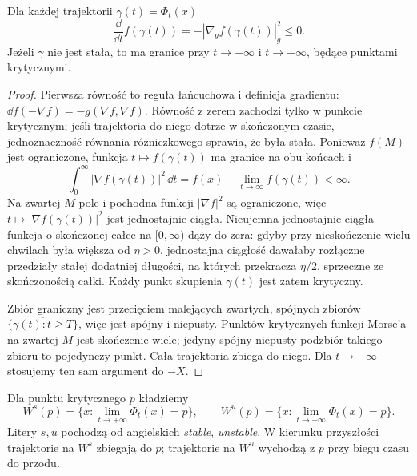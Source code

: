 \begin{stwierdzenie}
\label{prop:spadek-morse-17}
Dla każdej trajektorii $\gamma(t)=\Phi_t(x)$
\begin{equation}\label{eq:spadek-morse-17}
 \frac{\dd}{\dd t} f(\gamma(t))
 =-|\nabla_g f(\gamma(t))|_g^2\leq0.
\end{equation}
Jeżeli $\gamma$ nie jest stała, to
ma granice przy $t\to-\infty$
i $t\to+\infty$, będące
punktami krytycznymi.
\end{stwierdzenie}
\begin{proof}
Pierwsza równość to reguła łańcuchowa
i definicja gradientu:
$\dd f(-\nabla f)=-g(\nabla f,\nabla f)$.
Równość z zerem zachodzi tylko w punkcie
krytycznym; jeśli trajektoria
do niego dotrze w skończonym czasie,
jednoznaczność równania różniczkowego
sprawia, że była stała.
Ponieważ $f(M)$ jest ograniczone,
funkcja $t\mapsto f(\gamma(t))$
ma granice na obu końcach i
\[
 \int_0^\infty
       |\nabla f(\gamma(t))|^2\,\dd t
 =f(x)-\lim_{t\to\infty}f(\gamma(t))
 <\infty.
\]
Na zwartej $M$ pole i pochodna
funkcji $|\nabla f|^2$ są ograniczone,
więc $t\mapsto|\nabla f(\gamma(t))|^2$
jest jednostajnie ciągła.
Nieujemna jednostajnie ciągła
funkcja o skończonej całce na
$[0,\infty)$ dąży do zera:
gdyby przy nieskończenie wielu
chwilach była większa od $\eta>0$,
jednostajna ciągłość dawałaby
rozłączne przedziały stałej
dodatniej długości, na których
przekracza $\eta/2$, sprzeczne
ze skończonością całki.
Każdy punkt skupienia $\gamma(t)$
jest zatem krytyczny.

Zbiór graniczny jest przecięciem
malejących zwartych, spójnych
zbiorów
$\overline{\{\gamma(t):t\geq T\}}$,
więc jest spójny i niepusty.
Punktów krytycznych funkcji
Morse'a na zwartej $M$ jest
skończenie wiele; jedyny
spójny niepusty podzbiór
takiego zbioru to pojedynczy
punkt. Cała trajektoria
zbiega do niego. Dla
$t\to-\infty$ stosujemy
ten sam argument do $-X$.
\end{proof}

\begin{definicja}
\label{def:stable-morse-17}
Dla punktu krytycznego $p$ kładziemy
\[
 W^s(p)=\{x:\lim_{t\to+\infty}\Phi_t(x)=p\},
 \qquad
 W^u(p)=\{x:\lim_{t\to-\infty}\Phi_t(x)=p\}.
\]
Litery $s,u$ pochodzą od
angielskich \emph{stable}, \emph{unstable}.
W kierunku przyszłości trajektorie
na $W^s$ zbiegają do $p$;
trajektorie na $W^u$ wychodzą z $p$
przy biegu czasu do przodu.
\end{definicja}

